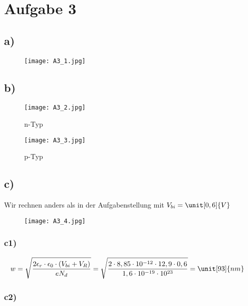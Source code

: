 \newpage

\section{Aufgabe 3}

\subsection*{a)}

\begin{figure}[h]
	\centering
	\texttt{[image: A3\_1.jpg]}
\end{figure}

\newpage

\subsection*{b)}


\begin{figure}[h]
	\centering
	\texttt{[image: A3\_2.jpg]}
	\caption{n-Typ}
\end{figure}


\begin{figure}[h]
	\centering
	\texttt{[image: A3\_3.jpg]}
	\caption{p-Typ}
\end{figure}

\newpage

\subsection*{c)}

Wir rechnen anders als in der Aufgabenstellung mit $V_{bi} = \unit[0,6]{V}$

\begin{figure}[h]
	\centering
	\texttt{[image: A3\_4.jpg]}
\end{figure}


\subsubsection*{c1)}


\begin{align*}
w &= \sqrt{\frac{2 \epsilon_r \cdot \epsilon_0 \cdot \left( V_{bi} + V_R \right)}{e N_d}} = \sqrt{\frac{2 \cdot 8,85 \cdot 10^{-12} \cdot 12,9 \cdot 0,6}{1,6 \cdot 10^{-19} \cdot 10^{23}}} = \unit[93]{nm}
\end{align*}


\subsubsection*{c2)}

